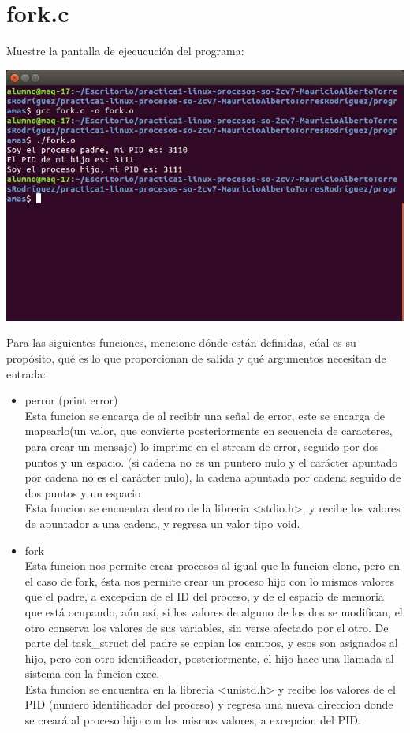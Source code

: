 \section{fork.c}

	Muestre la pantalla de ejecucución del programa:

	\begin{center}
		\includegraphics[width=\linewidth]{imagenes/forkc.png}
	\end{center}

	Para las siguientes funciones, mencione dónde están definidas, cúal es su propósito, qué es lo que proporcionan de salida y qué argumentos necesitan de entrada:

	\begin{itemize}

		\item perror (print error)
		\\ Esta funcion se encarga de al recibir una señal de error, este se encarga de mapearlo(un valor, que convierte posteriormente en secuencia de caracteres, para crear un mensaje) lo imprime en el stream de error, seguido por dos puntos y un espacio. (si cadena no es un puntero nulo y el carácter apuntado por cadena no es el carácter nulo), la cadena apuntada por cadena seguido de dos puntos y un espacio 
		\\Esta funcion se encuentra dentro de la libreria <stdio.h>, y recibe los valores de apuntador a una cadena, y regresa un valor tipo void.
		\item fork
		\\Esta funcion nos permite crear procesos al igual que la funcion clone, pero en el caso de fork, ésta nos permite crear un proceso hijo con lo mismos valores que el padre, a excepcion de el ID del proceso, y de el espacio de memoria que está ocupando, aún así, si los valores de alguno de los dos se modifican, el otro conserva los valores de sus variables, sin verse afectado por el otro. De parte del task\_struct del padre se copian los campos, y esos son asignados al hijo, pero con otro identificador, posteriormente, el hijo hace una llamada al sistema con la funcion exec.
		\\Esta funcion se encuentra en la libreria <unistd.h> y recibe los valores de el PID (numero identificador del proceso) y regresa una nueva direccion donde se creará al proceso hijo con los mismos valores, a excepcion del PID. 

	\end{itemize}

